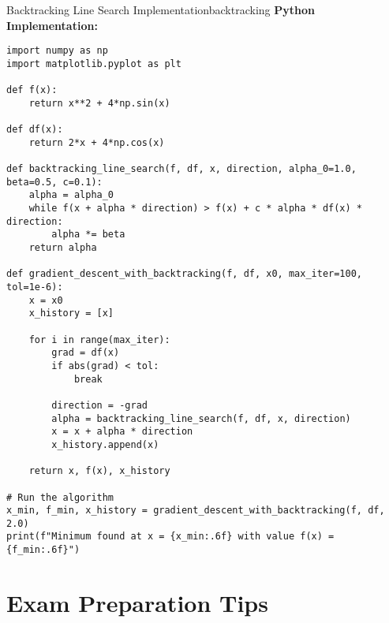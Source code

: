 \documentclass[12pt]{article}
\begin{document}
\begin{example}{Backtracking Line Search Implementation}{backtracking}
\textbf{Python Implementation:}
\begin{verbatim}
import numpy as np
import matplotlib.pyplot as plt

def f(x):
    return x**2 + 4*np.sin(x)

def df(x):
    return 2*x + 4*np.cos(x)

def backtracking_line_search(f, df, x, direction, alpha_0=1.0, beta=0.5, c=0.1):
    alpha = alpha_0
    while f(x + alpha * direction) > f(x) + c * alpha * df(x) * direction:
        alpha *= beta
    return alpha

def gradient_descent_with_backtracking(f, df, x0, max_iter=100, tol=1e-6):
    x = x0
    x_history = [x]
    
    for i in range(max_iter):
        grad = df(x)
        if abs(grad) < tol:
            break
            
        direction = -grad
        alpha = backtracking_line_search(f, df, x, direction)
        x = x + alpha * direction
        x_history.append(x)
        
    return x, f(x), x_history

# Run the algorithm
x_min, f_min, x_history = gradient_descent_with_backtracking(f, df, 2.0)
print(f"Minimum found at x = {x_min:.6f} with value f(x) = {f_min:.6f}")
\end{verbatim}
\end{example}


\section{Exam Preparation Tips}
\end{document}

